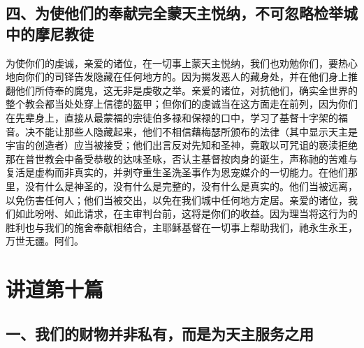 
\subsection{四、为使他们的奉献完全蒙天主悦纳，不可忽略检举城中的摩尼教徒}

为使你们的虔诚，亲爱的诸位，在一切事上蒙天主悦纳，我们也劝勉你们，要热心地向你们的司铎告发隐藏在任何地方的。因为揭发恶人的藏身处，并在他们身上推翻他们所侍奉的魔鬼，这无非是虔敬之举。亲爱的诸位，对抗他们，确实全世界的整个教会都当处处穿上信德的盔甲；但你们的虔诚当在这方面走在前列，因为你们在先辈身上，直接从最蒙福的宗徒伯多禄和保禄的口中，学习了基督十字架的福音。决不能让那些人隐藏起来，他们不相信藉梅瑟所颁布的法律（其中显示天主是宇宙的创造者）应当被接受；他们出言反对先知和圣神，竟敢以可咒诅的亵渎拒绝那在普世教会中备受恭敬的达味圣咏，否认主基督按肉身的诞生，声称祂的苦难与复活是虚构而非真实的，并剥夺重生圣洗圣事作为恩宠媒介的一切能力。在他们那里，没有什么是神圣的，没有什么是完整的，没有什么是真实的。他们当被远离，以免伤害任何人；他们当被交出，以免在我们城中任何地方定居。亲爱的诸位，我们如此吩咐、如此请求，在主审判台前，这将是你们的收益。因为理当将这行为的胜利也与我们的施舍奉献相结合，主耶稣基督在一切事上帮助我们，祂永生永王，万世无疆。阿们。\par



\section{讲道第十篇}

\par


\subsection{一、我们的财物并非私有，而是为天主服务之用}

